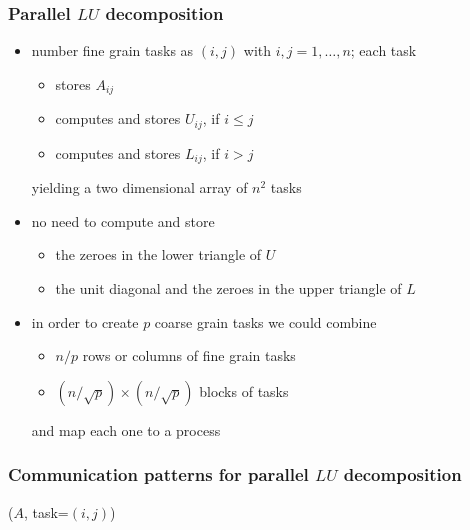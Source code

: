 \begin{frame}[fragile]
%
  \frametitle{Parallel $LU$ decomposition}
%
  \begin{itemize}
%
  \item number fine grain tasks as $(i,j)$ with $i,j = 1, \ldots, n$; each task
    \begin{itemize}
    \item stores $A_{ij}$
    \item computes and stores $U_{ij}$, if $i \leq j$
    \item computes and stores $L_{ij}$, if $i > j$
    \end{itemize}
    yielding a two dimensional array of $n^{2}$ tasks
%
  \item no need to compute and store
    \begin{itemize}
    \item the zeroes in the lower triangle of $U$
    \item the unit diagonal and the zeroes in the upper triangle of $L$
    \end{itemize}
%
  \item in order to create $p$ coarse grain tasks we could combine
    \begin{itemize}
    \item $n/p$ rows or columns of fine grain tasks
    \item $(n/\sqrt{p}) \times (n/\sqrt{p})$ blocks of tasks
    \end{itemize}
    and map each one to a process
%
  \end{itemize}
% 
\end{frame}

\begin{frame}[fragile]
%
  \frametitle{Communication patterns for parallel $LU$ decomposition}
%
  \begin{center}
    \begin{minipage}{.85\linewidth}
      \begin{algorithm}[H]
        \label{alg:pLU-ij}
%
        \DontPrintSemicolon
        \SetAlCapHSkip{0ex}
%
        \caption{\lu($A$, task=$(i,j)$)}
%
         
% 
      \end{algorithm}
    \end{minipage}
  \end{center}
%
\end{frame}

